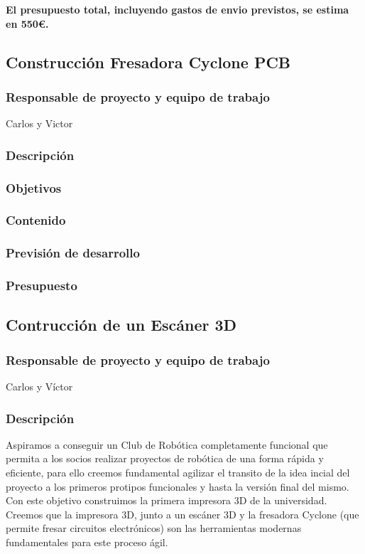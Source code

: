 \documentclass[12pt,twoside]{report}
\begin{document}
{\bf El presupuesto total, incluyendo gastos de envio previstos, se estima en 550\euro{}.}

\subsection{Construcción Fresadora Cyclone PCB}
\subsubsection{Responsable de proyecto y equipo de trabajo}
Carlos y Victor
\subsubsection{Descripción}
\subsubsection{Objetivos}
\subsubsection{Contenido}
\subsubsection{Previsión de desarrollo}
\subsubsection{Presupuesto}


\subsection{Contrucción de un Escáner 3D}
\subsubsection{Responsable de proyecto y equipo de trabajo}
Carlos y Víctor
\subsubsection{Descripción}
Aspiramos a conseguir un Club de Robótica completamente funcional que permita a los socios realizar proyectos de robótica de una forma rápida y eficiente, para ello creemos fundamental agilizar el transito de la idea incial del proyecto a los primeros protipos funcionales y hasta la versión final del mismo. \\
Con este objetivo construimos la primera impresora 3D de la universidad. Creemos que la impresora 3D, junto a un escáner 3D y la fresadora Cyclone (que permite fresar circuitos electrónicos) son las herramientas modernas fundamentales para este proceso ágil.
\end{document}
